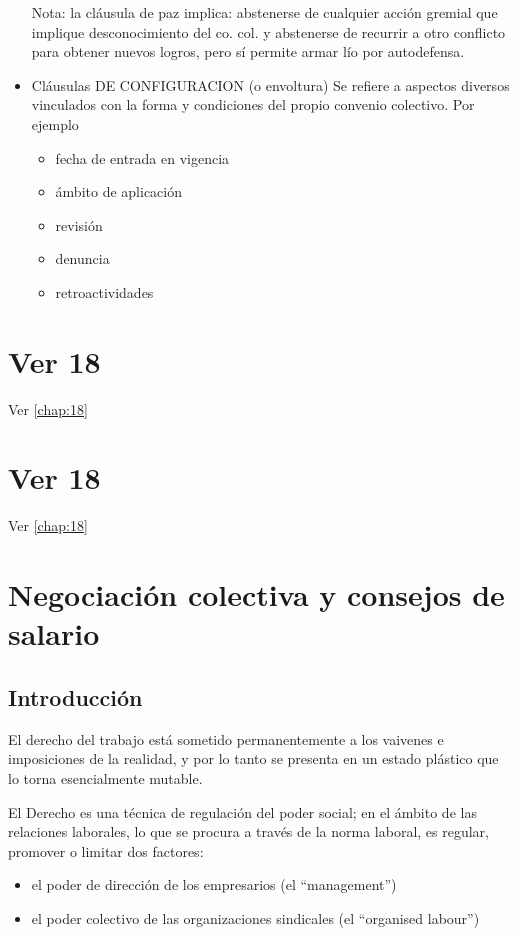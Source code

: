 \documentclass[spanish,12pt,a4paper,titlepage]{report}
\begin{document}
\begin{itemize}
	Nota: la cláusula de paz implica: abstenerse de cualquier acción gremial que implique desconocimiento del co. col. y abstenerse de recurrir a otro conflicto para obtener nuevos logros, pero sí permite armar lío por autodefensa.
	\item Cláusulas DE CONFIGURACION (o envoltura)
	Se refiere a aspectos diversos vinculados con la forma y condiciones del propio convenio colectivo. Por ejemplo
	\begin{itemize}
		\item fecha de entrada en vigencia
		\item ámbito de aplicación
		\item revisión
		\item denuncia
		\item retroactividades
	\end{itemize}
\end{itemize}

\chapter{Ver 18}
Ver \ref{chap:18}

\chapter{Ver 18}
Ver \ref{chap:18}

\chapter{Negociación colectiva y consejos de salario}

\section{Introducción}

El derecho del trabajo está sometido permanentemente a los vaivenes e imposiciones de la realidad,  y por lo tanto se presenta en un estado plástico que lo torna esencialmente mutable.

El Derecho es una técnica de regulación del poder social; en el ámbito de las relaciones laborales, lo que se procura a través de la norma laboral, es regular, promover o limitar dos factores:
\begin{itemize}
\item el poder de dirección de los empresarios (el “management”) 
\item el poder colectivo de las organizaciones sindicales (el “organised labour”)
\end{itemize}
\end{document}
